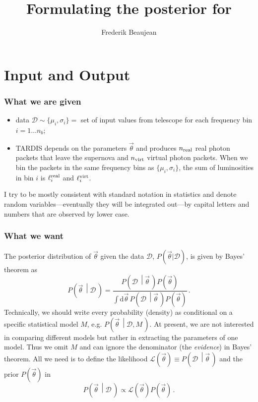 \documentclass[a4,12pt]{article}
\title{Formulating the posterior for \tardis}
\author{Frederik Beaujean}
\newcommand{\data}{\ensuremath{\mathcal{D}}}
\newcommand{\expin}{\ensuremath{\lbrace\mu_i, \sigma_i\rbrace}}
\newcommand{\given}[2]{\left(#1\, \middle| #2 \, \right)}
\newcommand{\likelihood}{\ensuremath{\mathcal{L}}}
\newcommand{\lumi}{\ensuremath{\ell_i}}
\newcommand{\real}{\ensuremath{{\rm real}}}
\newcommand{\virt}{\ensuremath{{\rm virt}}}
\newcommand{\rmdx}[1]{\mbox{d} #1 \,} %
\newcommand{\vecth}{\ensuremath{{\vec{\theta}}}}
\newcommand{\tardis}{TARDIS}
\begin{document}
\maketitle

\section{Input and Output}

\subsubsection*{What we are given}
\begin{itemize}
\item data $\data \sim \expin =$ set of input values from
  telescope for each frequency bin $i=1 \dots n_b$;
\item \tardis{} depends on the parameters $\vecth$ and
  produces $n_\real$ real photon packets that leave the supernova and
  $n_\virt$ virtual photon packets. When we bin the packets in the same
  frequency bins as \expin, the sum of luminosities in bin $i$ is
  $\lumi^\real$ and $\lumi^\virt$.
\end{itemize}
I try to be mostly consistent with standard notation in statistics and
denote random variables---eventually they will be integrated out---by
capital letters and numbers that are observed by lower case.

\subsubsection*{What we want}
The posterior distribution of $\vecth$ given the data $\data$,
$P(\vecth | \data)$, is given by  Bayes' theorem as
\begin{equation}
  \label{eq:Bayes-full}
  P\given{\vecth}{\data} = \frac{P\given{\data}{\vecth} P(\vecth)}{\int \rmdx{\vecth} P\given{\data}{\vecth} P(\vecth)} \,.
\end{equation}
Technically, we should write every probability (density) as
conditional on a specific statistical model $M$,
e.g. $P\given{\vecth}{\data, M}$.  At present, we are not interested
in comparing different models but rather in extracting the parameters
of one model. Thus we omit $M$ and can ignore the denominator (the
\emph{evidence}) in Bayes' theorem. All we need is to define the
likelihood $\likelihood(\vecth) \equiv P\given{\data}{\vecth}$ and the
prior $P(\vecth)$ in
\begin{equation}
  \label{eq:Bayes-simple}
  P\given{\vecth}{\data} \propto \likelihood(\vecth) P(\vecth) \,.
\end{equation}
\end{document}
